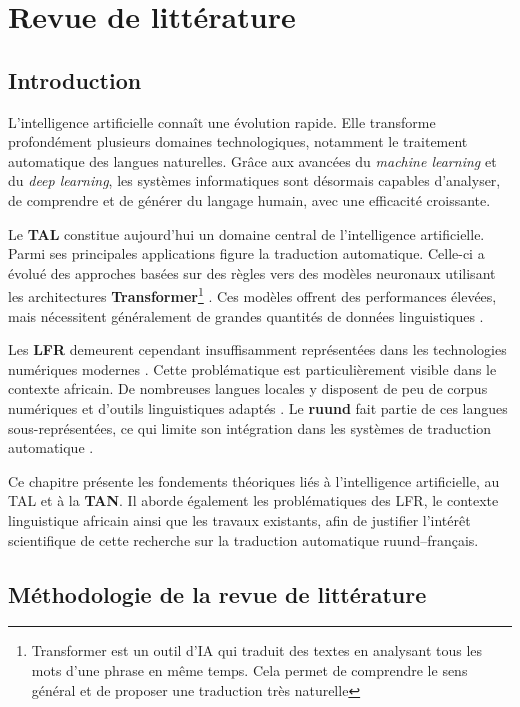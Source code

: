 \chapter{Revue de littérature}
\section{Introduction}
L'intelligence artificielle connaît une évolution rapide. Elle transforme profondément plusieurs domaines technologiques, notamment le traitement automatique des langues naturelles. Grâce aux avancées du \textit{machine learning} et du \textit{deep learning}, les systèmes informatiques sont désormais capables d'analyser, de comprendre et de générer du langage humain, avec une efficacité croissante.

Le \textbf{\ac{TAL}} constitue aujourd'hui un domaine central de l'intelligence artificielle. Parmi ses principales applications figure la traduction automatique. Celle-ci a évolué des approches basées sur des règles vers des modèles neuronaux utilisant les architectures \textbf{Transformer}\footnote{Transformer est un outil d'IA qui traduit des textes en analysant tous les mots d'une phrase en même temps. Cela permet de comprendre le sens général et de proposer une traduction très naturelle } \cite{vaswani2017attention}. Ces modèles offrent des performances élevées, mais nécessitent généralement de grandes quantités de données linguistiques \cite{ranathunga2023neural}.

Les \textbf{\ac{LFR}} demeurent cependant insuffisamment représentées dans les technologies numériques modernes \cite{ranathunga2023neural}. Cette problématique est particulièrement visible dans le contexte africain. De nombreuses langues locales y disposent de peu de corpus numériques et d'outils linguistiques adaptés \cite{agyei2024low}. Le \textbf{ruund} fait partie de ces langues sous-représentées, ce qui limite son intégration dans les systèmes de traduction automatique \cite{haulai2023construction}.

Ce chapitre présente les fondements théoriques liés à l'intelligence artificielle, au \ac{TAL} et à la \textbf{\ac{TAN}}. Il aborde également les problématiques des \ac{LFR}, le contexte linguistique africain ainsi que les travaux existants, afin de justifier l'intérêt scientifique de cette recherche sur la traduction automatique ruund--français.


\section{Méthodologie de la revue de littérature}


